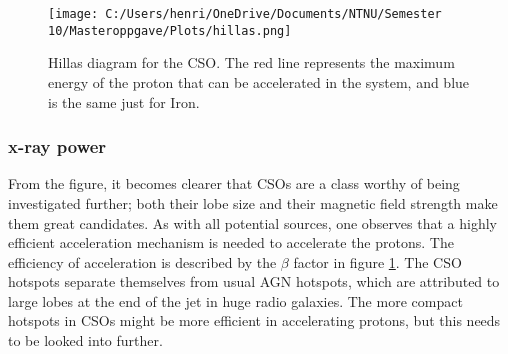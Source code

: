 \begin{figure}
    \centering
    \texttt{[image: C:/Users/henri/OneDrive/Documents/NTNU/Semester 10/Masteroppgave/Plots/hillas.png]}
    \caption{Hillas diagram for the CSO. The red line represents the maximum energy of the proton that can be accelerated in the system, and blue is the same just for Iron. }
    \label{fig:Hillas}
\end{figure}

\subsubsection{x-ray power}
From the figure, it becomes clearer that CSOs are a class worthy of being investigated further; both their lobe size and their magnetic field strength make them great candidates. As with all potential sources, one observes that a highly efficient acceleration mechanism is needed to accelerate the protons. The efficiency of acceleration is described by the $\beta$ factor in figure \ref*{fig:Hillas}. The CSO hotspots separate themselves from usual AGN hotspots, which are attributed to large lobes at the end of the jet in huge radio galaxies. The more compact hotspots in CSOs might be more efficient in accelerating protons, but this needs to be looked into further.

